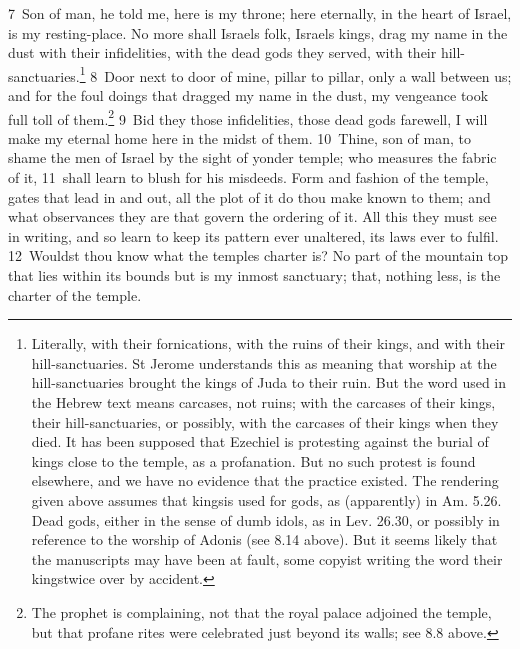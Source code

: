\documentclass[10pt]{book} %
\begin{document}
\textcolor{benred8}{7}~Son of man, he told me, here is my throne; here eternally, in the heart of Israel, is my resting-place. No more shall Israel\textquotesingle s folk, Israel\textquotesingle s kings, drag my name in the dust with their infidelities, with the dead gods they served, with their hill-sanctuaries.\footnote[1]{Literally, \textasciigrave with their fornications, with the ruins of their kings, and with their hill-sanctuaries\textquotesingle . St Jerome understands this as meaning that worship at the hill-sanctuaries brought the kings of Juda to their ruin. But the word used in the Hebrew text means carcases, not ruins; \textasciigrave with the carcases of their kings, their hill-sanctuaries\textquotesingle , or possibly, \textasciigrave with the carcases of their kings when they died\textquotesingle . It has been supposed that Ezechiel is protesting against the burial of kings close to the temple, as a profanation. But no such protest is found elsewhere, and we have no evidence that the practice existed. The rendering given above assumes that \textasciigrave kings\textquotesingle  is used for \textasciigrave gods\textquotesingle , as (apparently) in Am. 5.26. \textasciigrave Dead gods\textquotesingle , either in the sense of \textasciigrave dumb idols\textquotesingle , as in Lev. 26.30, or possibly in reference to the worship of Adonis (see 8.14 above). But it seems likely that the manuscripts may have been at fault, some copyist writing the word \textasciigrave their kings\textquotesingle  twice over by accident.} \textcolor{benred8}{8}~Door next to door of mine, pillar to pillar, only a wall between us; and for the foul doings that dragged my name in the dust, my vengeance took full toll of them.\footnote[2]{The prophet is complaining, not that the royal palace adjoined the temple, but that profane rites were celebrated just beyond its walls; see 8.8 above.} \textcolor{benred8}{9}~Bid they those infidelities, those dead gods farewell, I will make my eternal home here in the midst of them. \textcolor{benred8}{10}~Thine, son of man, to shame the men of Israel by the sight of yonder temple; who measures the fabric of it, \textcolor{benred8}{11}~shall learn to blush for his misdeeds. Form and fashion of the temple, gates that lead in and out, all the plot of it do thou make known to them; and what observances they are that govern the ordering of it. All this they must see in writing, and so learn to keep its pattern ever unaltered, its laws ever to fulfil.
\textcolor{benred8}{12}~Wouldst thou know what the temple\textquotesingle s charter is? No part of the mountain top that lies within its bounds but is my inmost sanctuary; that, nothing less, is the charter of the temple.
\end{document}
